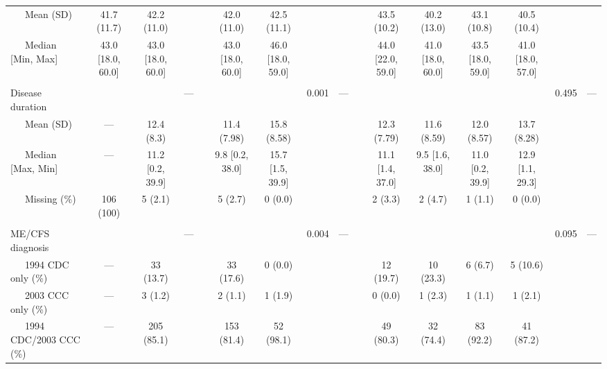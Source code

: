 \begin{tabular}{lccccccccccccccc}
~~~Mean (SD) & 41.7 (11.7) & 42.2 (11.0) & & & 42.0 (11.0) & 42.5 (11.1) & & & & 43.5 (10.2) & 40.2 (13.0) & 43.1 (10.8) & 40.5 (10.4) & & \\
~~~Median [Min, Max] & 43.0 [18.0, 60.0] & 43.0 [18.0, 60.0] & & & 43.0 [18.0, 60.0] & 46.0 [18.0, 59.0] & & & & 44.0 [22.0, 59.0] & 41.0 [18.0, 60.0] & 43.5 [18.0, 59.0] & 41.0 [18.0, 57.0] & & \\
&&&&&&&&&&&&&&& \\
Disease duration & & & --- & & & & 0.001 & --- & & & & & & 0.495 & --- \\
~~~Mean (SD) & --- & 12.4 (8.3) & & & 11.4 (7.98) & 15.8 (8.58) & & & & 12.3 (7.79) & 11.6 (8.59) & 12.0 (8.57) & 13.7 (8.28) & & \\
~~~Median [Max, Min] & --- & 11.2 [0.2, 39.9] & & & 9.8 [0.2, 38.0] & 15.7 [1.5, 39.9] & & & & 11.1 [1.4, 37.0] & 9.5 [1.6, 38.0] & 11.0 [0.2, 39.9] & 12.9 [1.1, 29.3] & & \\
~~~Missing (\%) & 106 (100) & 5 (2.1) & & & 5 (2.7) & 0 (0.0) & & & & 2 (3.3) & 2 (4.7) & 1 (1.1) & 0 (0.0) & & \\
&&&&&&&&&&&&&&& \\
ME/CFS diagnosis & & & --- & & & & 0.004 & --- & & & & & & 0.095 & --- \\
~~~1994 CDC only (\%) & --- & 33 (13.7) & & & 33 (17.6) & 0 (0.0) & & & & 12 (19.7) & 10 (23.3) & 6 (6.7) & 5 (10.6) & & \\
~~~2003 CCC only (\%) & --- & 3 (1.2) & & & 2 (1.1) & 1 (1.9) & & & & 0 (0.0) & 1 (2.3) & 1 (1.1) & 1 (2.1) & & \\
~~~1994 CDC/2003 CCC (\%) & --- & 205 (85.1) & & & 153 (81.4) & 52 (98.1) & & & & 49 (80.3) & 32 (74.4) & 83 (92.2) & 41 (87.2) & & \\
\bottomrule
\end{tabular}